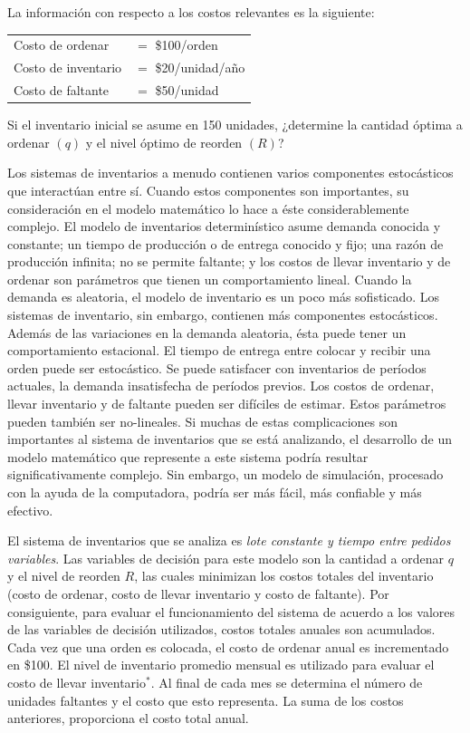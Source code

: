 \documentclass[11pt,letterpaper]{report}
\begin{document}
La información con respecto a los costos relevantes es la siguiente:

\begin{center}
\begin{tabular}{ll}
Costo de ordenar    & $=$ \$100/orden \\
Costo de inventario & $=$ \$20/unidad/año \\
Costo de faltante   & $=$ \$50/unidad \\
\end{tabular}
\end{center}

Si el inventario inicial se asume en 150 unidades, ¿determine la cantidad
óptima a ordenar $(q)$ y el nivel óptimo de reorden $(R)$?

Los sistemas de inventarios a menudo contienen varios componentes
estocásticos que interactúan entre sí. Cuando estos componentes son
importantes, su consideración en el modelo matemático lo hace a éste
considerablemente complejo. El modelo de inventarios determinístico asume
demanda conocida y constante; un tiempo de producción o de entrega conocido
y fijo; una razón de producción infinita; no se permite faltante; y los
costos de llevar inventario y de ordenar son parámetros que tienen un
comportamiento lineal. Cuando la demanda es aleatoria, el modelo de
inventario es un poco más sofisticado. Los sistemas de inventario, sin
embargo, contienen más componentes estocásticos. Además de las variaciones
en la demanda aleatoria, ésta puede tener un comportamiento estacional. El
tiempo de entrega entre colocar y recibir una orden puede ser estocástico.
Se puede satisfacer con inventarios de períodos actuales, la demanda
insatisfecha de períodos previos. Los costos de ordenar, llevar inventario
y de faltante pueden ser difíciles de estimar. Estos parámetros pueden
también ser no-lineales. Si muchas de estas complicaciones son importantes
al sistema de inventarios que se está analizando, el desarrollo de un
modelo matemático que represente a este sistema podría resultar
significativamente complejo. Sin embargo, un modelo de simulación,
procesado con la ayuda de la computadora, podría ser más fácil, más
confiable y más efectivo.

El sistema de inventarios que se analiza es \emph{lote constante y tiempo
entre pedidos variables}. Las variables de decisión para este modelo son la
cantidad a ordenar $q$ y el nivel de reorden $R$, las cuales minimizan los
costos totales del inventario (costo de ordenar, costo de llevar inventario
y costo de faltante). Por consiguiente, para evaluar el funcionamiento del
sistema de acuerdo a los valores de las variables de decisión utilizados,
costos totales anuales son acumulados. Cada vez que una orden es colocada,
el costo de ordenar anual es incrementado en \$100. El nivel de inventario
promedio mensual es utilizado para evaluar el costo de llevar
inventario$^{*}$. Al final de cada mes se determina el número de unidades
faltantes y el costo que esto representa. La suma de los costos anteriores,
proporciona el costo total anual.
\end{document}
